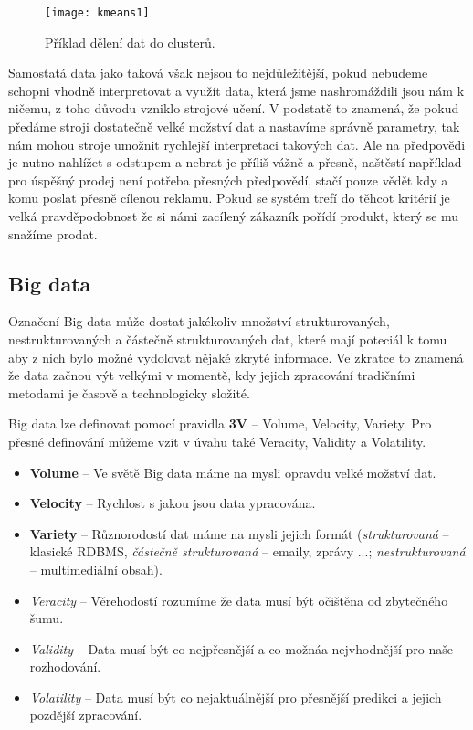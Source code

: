 \begin{figure}[htp]
  \centering
  \texttt{[image: kmeans1]}
  \caption{Příklad dělení dat do clusterů.}
  \label{cluster-fig}
\end{figure}

\par Samostatá data jako taková však nejsou to nejdůležitější, pokud nebudeme schopni vhodně interpretovat a využít data, která jsme nashromáždili jsou nám k ničemu, z toho důvodu vzniklo strojové učení. V podstatě to znamená, že pokud předáme stroji dostatečně velké možství dat a nastavíme správně parametry, tak nám mohou stroje umožnit rychlejší interpretaci takových dat. Ale na předpovědi je nutno nahlížet s odstupem a nebrat je příliš vážně a přesně, naštěstí například pro úspěšný prodej není potřeba přesných předpovědí, stačí pouze vědět kdy a komu poslat přesně cílenou reklamu. Pokud se systém trefí do těhcot kritérií je velká pravděpodobnost že si námi zacílený zákazník pořídí produkt, který se mu snažíme prodat. \cite{predictive-analytics}

\subsection{Big data} \label{big-data}
Označení Big data může dostat jakékoliv množství strukturovaných, nestrukturovaných a částečně strukturovaných dat, které mají poteciál k tomu aby z nich bylo možné vydolovat nějaké zkryté informace. Ve zkratce to znamená že data začnou výt velkými v momentě, kdy jejich zpracování tradičními metodami je časově a technologicky složité.\cite{big-data-anayitics}

\par Big data lze definovat pomocí pravidla \textbf{3V} -- Volume, Velocity, Variety. Pro přesné definování můžeme vzít v úvahu také Veracity, Validity a Volatility.\cite{big-data-anayitics}
\begin{itemize}
  \item \textbf{Volume} -- Ve světě Big data máme na mysli opravdu velké možství dat.
  \item \textbf{Velocity} -- Rychlost s jakou jsou data ypracována.
  \item \textbf{Variety} -- Různorodostí dat máme na mysli jejich formát (\textit{strukturovaná} -- klasické RDBMS, \textit{částečně strukturovaná} -- emaily, zprávy ...; \textit{nestrukturovaná} -- multimediální obsah).
  \item \textit{Veracity} -- Věrehodostí rozumíme že data musí být očištěna od zbytečného šumu.
  \item \textit{Validity} -- Data musí být co nejpřesnější a co možnáa nejvhodnější pro naše rozhodování.
  \item \textit{Volatility} -- Data musí být co nejaktuálnější pro přesnější predikci a jejich pozdější zpracování. \cite{big-data-anayitics}
\end{itemize}

